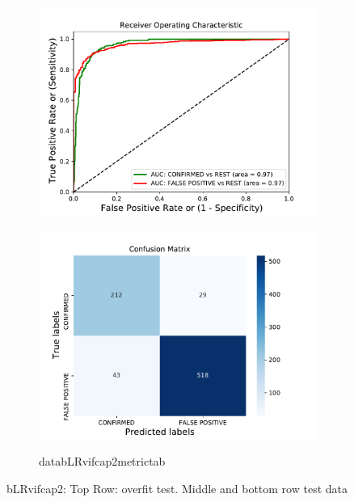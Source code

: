 \begin{figure}[H]
\begin{subfigure}{.49\textwidth}
                \includegraphics[width = 1\textwidth]{data/bLR_vif_cap2_roc.pdf}
                \end{subfigure}
                \begin{subfigure}{.49\textwidth}
                \includegraphics[width = 1\textwidth]{data/bLR_vif_cap2_cm.pdf}
                \end{subfigure}
                \begin{subfigure}{1\textwidth}
                \csname databLRvifcap2metrictab\endcsname
                \end{subfigure}
                \caption{bLRvifcap2: Top Row: overfit test. Middle and bottom row test data}
                \label{fig:data/bLR_vif_cap2_roc}
                \end{figure}